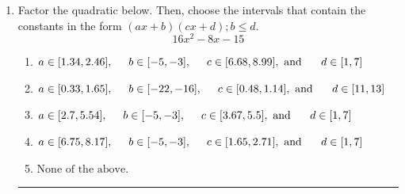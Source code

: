 \documentclass[14pt]{extbook}
\newcommand{\litem}[1]{\item#1\hspace*{-1cm}\rule{\textwidth}{0.4pt}}
\begin{document}
\begin{enumerate}
{\begin{enumerate}[label=\Alph*.]
\end{enumerate} }
\litem{
Factor the quadratic below. Then, choose the intervals that contain the constants in the form $(ax+b)(cx+d); b \leq d.$\[ 16x^{2} -8 x -15 \]\begin{enumerate}[label=\Alph*.]
\item \( a \in [1.34, 2.46], \hspace*{5mm} b \in [-5, -3], \hspace*{5mm} c \in [6.68, 8.99], \text{ and } \hspace*{5mm} d \in [1, 7] \)
\item \( a \in [0.33, 1.65], \hspace*{5mm} b \in [-22, -16], \hspace*{5mm} c \in [0.48, 1.14], \text{ and } \hspace*{5mm} d \in [11, 13] \)
\item \( a \in [2.7, 5.54], \hspace*{5mm} b \in [-5, -3], \hspace*{5mm} c \in [3.67, 5.5], \text{ and } \hspace*{5mm} d \in [1, 7] \)
\item \( a \in [6.75, 8.17], \hspace*{5mm} b \in [-5, -3], \hspace*{5mm} c \in [1.65, 2.71], \text{ and } \hspace*{5mm} d \in [1, 7] \)
\item \( \text{None of the above.} \)

\end{enumerate} }
\end{enumerate}
\end{document}
